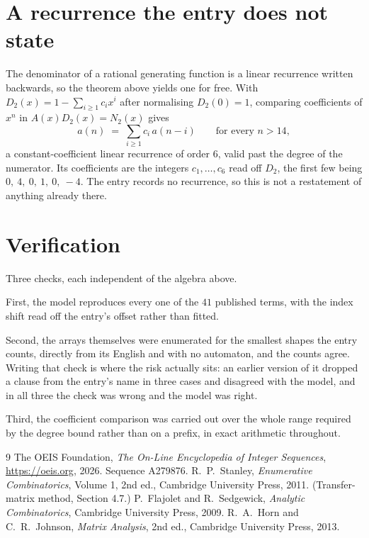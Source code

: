 \documentclass[11pt,a4paper]{article}
\theoremstyle{plain}
\theoremstyle{definition}
\begin{document}
\section{A recurrence the entry does not state}

The denominator of a rational generating function is a linear recurrence written backwards, so
the theorem above yields one for free. With $D_2(x)=1-\sum_{i\ge1}c_ix^i$ after normalising
$D_2(0)=1$, comparing coefficients of $x^n$ in $A(x)D_2(x)=N_2(x)$ gives
\[
a(n)\;=\;\sum_{i\ge1}c_i\,a(n-i)\qquad\text{for every }n>14,
\]
a constant-coefficient linear recurrence of order $6$, valid past the degree of the
numerator. Its coefficients are the integers $c_1,\dots,c_{6}$ read off $D_2$, the first few being $0,\ 4,\ 0,\ 1,\ 0,\ -4$. The entry records no recurrence, so this is not a restatement of anything
already there.

\section{Verification}

Three checks, each independent of the algebra above.

First, the model reproduces every one of the $41$ published terms, with the index shift
read off the entry's offset rather than fitted.

Second, the arrays themselves were enumerated for the smallest shapes the entry counts,
directly from its English and with no automaton, and the counts agree. Writing that check is
where the risk actually sits: an earlier version of it dropped a clause from the entry's name
in three cases and disagreed with the model, and in all three the check was wrong and the model
was right.

Third, the coefficient comparison was carried out over the whole range required by the degree
bound rather than on a prefix, in exact arithmetic throughout.

\begin{thebibliography}{9}
 The OEIS Foundation, \emph{The On-Line Encyclopedia of Integer
Sequences}, \url{https://oeis.org}, 2026. Sequence A279876.
 R.~P.~Stanley, \emph{Enumerative Combinatorics}, Volume 1, 2nd ed.,
Cambridge University Press, 2011. (Transfer-matrix method, Section 4.7.)
 P.~Flajolet and R.~Sedgewick, \emph{Analytic Combinatorics}, Cambridge
University Press, 2009.
 R.~A.~Horn and C.~R.~Johnson, \emph{Matrix Analysis}, 2nd ed., Cambridge
University Press, 2013.
\end{thebibliography}
\end{document}
